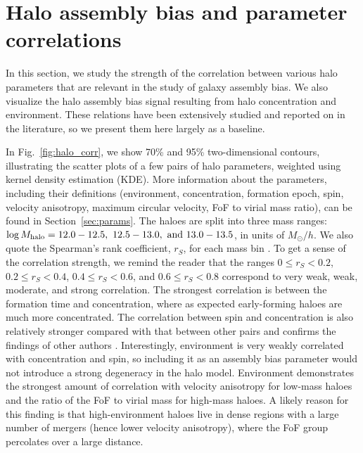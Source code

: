 \documentclass[fleqn,usenatbib]{mnras}
\newcommand{\rss}[1]{\textcolor{purple}{(rss: #1)}}
\begin{document}
\section{Halo assembly bias and parameter correlations}
\label{app:hab_corr}
In this section, we study the strength of the correlation between various halo parameters that are relevant in the study of galaxy assembly bias. We also visualize the halo assembly bias signal resulting from halo concentration and environment. These relations have been extensively studied and reported on in the literature, so we present them here largely as a baseline. 

In Fig.~\ref{fig:halo_corr},
we show 70\% and 95\% two-dimensional contours, illustrating the scatter plots of a few pairs of halo parameters, weighted using kernel density estimation (KDE). More information about the parameters, including their definitions (environment, concentration, formation epoch, spin, velocity anisotropy, maximum circular velocity, FoF to virial mass ratio), can be found in Section~\ref{sec:params}. The haloes are split into three mass ranges: $\log M_{\rm halo} = 12.0 - 12.5, \ 12.5 - 13.0, \ {\rm and} \ 13.0 - 13.5$, in units of $M_\odot/h$. We also quote the Spearman's rank coefficient, $r_S$, for each mass bin \citep{spearman04}. 
To get a sense of the correlation strength, we remind the reader that the ranges $0 \leq r_S < 0.2$, $0.2 \leq r_S < 0.4$, $0.4 \leq r_S < 0.6$, and $0.6 \leq r_S < 0.8$ correspond to very weak, weak, moderate, and strong correlation. The strongest correlation is between the formation time and concentration, where as expected early-forming haloes are much more concentrated. The correlation between spin and concentration is also relatively stronger compared with that between other pairs and confirms the findings of other authors \citep[e.g.][]{sownak}. Interestingly, environment is very weakly correlated with concentration and spin, so including it as an assembly bias parameter would not introduce a strong degeneracy in the halo model. Environment demonstrates the strongest amount of correlation with velocity anisotropy for low-mass haloes and the ratio of the FoF to virial mass for high-mass haloes. A likely reason for this finding is that high-environment haloes live in dense regions with a large number of mergers (hence lower velocity anisotropy), where the FoF group percolates over a large distance.
\end{document}
